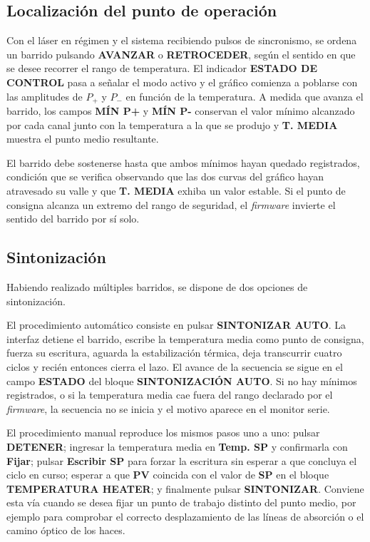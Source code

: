\subsection{Localización del punto de operación}

Con el láser en régimen y el sistema recibiendo pulsos de sincronismo, se ordena un
barrido pulsando \textbf{AVANZAR} o \textbf{RETROCEDER}, según el sentido en que se
desee recorrer el rango de temperatura. El indicador \textbf{ESTADO DE CONTROL} pasa
a señalar el modo activo y el gráfico comienza a poblarse con las amplitudes de
$P_+$ y $P_-$ en función de la temperatura. A medida que avanza el barrido, los
campos \textbf{MÍN P+} y \textbf{MÍN P-} conservan el valor mínimo alcanzado por cada
canal junto con la temperatura a la que se produjo y \textbf{T. MEDIA} muestra el
punto medio resultante.

El barrido debe sostenerse hasta que ambos mínimos hayan quedado registrados,
condición que se verifica observando que las dos curvas del gráfico hayan atravesado
su valle y que \textbf{T. MEDIA} exhiba un valor estable. Si el punto de consigna
alcanza un extremo del rango de seguridad, el \emph{firmware} invierte el sentido del
barrido por sí solo.

\subsection{Sintonización}

Habiendo realizado múltiples barridos, se dispone de dos opciones de sintonización.

El procedimiento automático consiste en pulsar \textbf{SINTONIZAR AUTO}. La interfaz detiene el barrido,
escribe la temperatura media como punto de consigna, fuerza su escritura, aguarda la
estabilización térmica, deja transcurrir cuatro ciclos y recién entonces cierra el
lazo. El avance de la secuencia se sigue en el campo \textbf{ESTADO} del bloque
\textbf{SINTONIZACIÓN AUTO}. Si no hay mínimos registrados, o si la temperatura media
cae fuera del rango declarado por el \emph{firmware}, la secuencia no se inicia y el
motivo aparece en el monitor serie.

El procedimiento manual reproduce los mismos pasos uno a uno: pulsar
\textbf{DETENER}; ingresar la temperatura media en \textbf{Temp. SP} y confirmarla
con \textbf{Fijar}; pulsar \textbf{Escribir SP} para forzar la escritura sin esperar
a que concluya el ciclo en curso; esperar a que \textbf{PV} coincida con el valor de
\textbf{SP} en el bloque \textbf{TEMPERATURA HEATER}; y finalmente pulsar
\textbf{SINTONIZAR}. Conviene esta vía cuando se desea fijar un punto de trabajo
distinto del punto medio, por ejemplo para comprobar el correcto desplazamiento de las líneas de absorción o el camino óptico de los haces.

